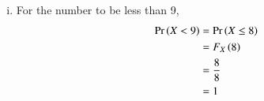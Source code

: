 \documentclass[journal,12pt,twocolumn]{IEEEtran}
\renewcommand\thesection{\arabic{section}}
\begin{document}
{\begin{enumerate}[(i)]
    \item For the number to be less than 9,
    \begin{align}
        \Pr\left(X < 9\right) &= \Pr\left(X \le 8\right)   \nonumber\\
                   &= F_{X}\left(8\right)  \nonumber\\
                   &= \frac{8}{8}  \nonumber\\
                   &= 1             \nonumber
    \end{align}    
    
\end{enumerate}
}
%

\end{document}
